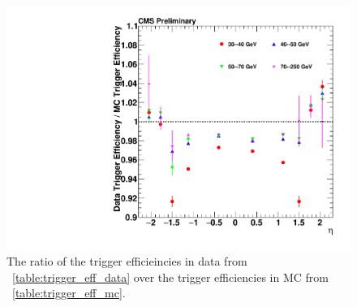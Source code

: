 \begin{figure}[!p]
    \centering
    \includegraphics[width=\textwidth]{figures/trigger_eff_ratio.pdf}
    \caption{
        The ratio of the trigger efficieincies in data from
        \TAB~\ref{table:trigger_eff_data} over the trigger efficiencies in
        \MADGRAPH MC from \TAB~\ref{table:trigger_eff_mc}.
    }
    \label{fig:trigger_eff_ratio}
\end{figure}
